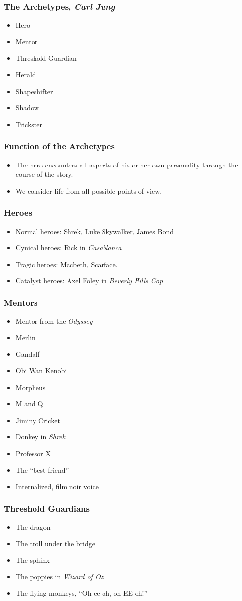 \documentclass{beamer}
\newcommand{\bi}{\begin{itemize}}
\newcommand{\ei}{\end{itemize}}
\begin{document}
\begin{frame}\frametitle{The Archetypes, \em Carl Jung}

\bi
\item Hero
\item Mentor
\item Threshold Guardian
\item Herald
\item Shapeshifter
\item Shadow
\item Trickster
\ei

\end{frame}
\begin{frame}\frametitle{Function of the Archetypes}

\bi
\item
The hero encounters all aspects of his or her own personality
through the course of the story.
\item
We consider life from all possible points of view.
\ei

\end{frame}
\begin{frame}\frametitle{Heroes}
\bi
\item Normal heroes: Shrek, Luke Skywalker, James Bond
\item Cynical heroes: Rick in {\em Casablanca}
\item Tragic heroes: Macbeth, Scarface.
\item Catalyst heroes: Axel Foley in {\em Beverly Hills Cop}
\ei 

\end{frame}
\begin{frame}\frametitle{Mentors}
\bi
\item Mentor from the {\em Odyssey}
\item Merlin
\item Gandalf
\item Obi Wan Kenobi
\item Morpheus
\item M and Q
\item Jiminy Cricket
\item Donkey in {\em Shrek}
\item Professor X
\item The ``best friend''
\item Internalized, film noir voice
\ei

\end{frame}
\begin{frame}\frametitle{Threshold Guardians}
\bi
\item The dragon
\item The troll under the bridge
\item The sphinx
\item The poppies in {\em Wizard of Oz}
\item The flying monkeys, ``Oh-ee-oh, oh-EE-oh!''
\ei

\end{frame}
\end{document}
